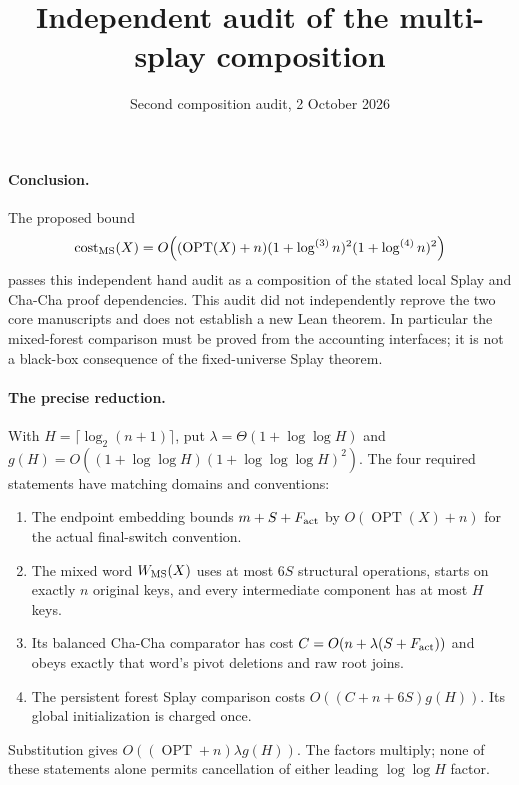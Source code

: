 \documentclass[11pt]{article}
\title{Independent audit of the multi-splay composition}
\author{Second composition audit, 2 October 2026}
\date{}
\begin{document}
\maketitle

\paragraph{Conclusion.}
The proposed bound
\[
 \operatorname{cost}_{\rm MS}(X)
 =O\!\left((\operatorname{OPT}(X)+n)
       (1+\log^{(3)}n)^2(1+\log^{(4)}n)^2\right)
\]
passes this independent hand audit as a composition of the stated local
Splay and Cha-Cha proof dependencies. This audit did not
independently reprove the two core manuscripts and does not establish
a new Lean theorem. In particular the mixed-forest comparison must be
proved from the accounting interfaces; it is not a black-box consequence
of the fixed-universe Splay theorem.

\paragraph{The precise reduction.}
With $H=\lceil\log_2(n+1)\rceil$, put
$\lambda=\Theta(1+\log\log H)$ and
$g(H)=O((1+\log\log H)(1+\log\log\log H)^2)$.
The four required statements have matching domains and conventions:
\begin{enumerate}
\item The endpoint embedding bounds $m+S+F_{\rm act}$ by
      $O(\operatorname{OPT}(X)+n)$ for the actual final-switch convention.
\item The mixed word $W_{\rm MS}(X)$ uses at most $6S$ structural
      operations, starts on exactly $n$ original keys, and every
      intermediate component has at most $H$ keys.
\item Its balanced Cha-Cha comparator has cost
      $C=O(n+\lambda(S+F_{\rm act}))$ and obeys exactly that word's
      pivot deletions and raw root joins.
\item The persistent forest Splay comparison costs
      $O((C+n+6S)g(H))$. Its global initialization is charged once.
\end{enumerate}
Substitution gives $O((\operatorname{OPT}+n)\lambda g(H))$.
The factors multiply; none of these statements alone permits cancellation
of either leading $\log\log H$ factor.
\end{document}
